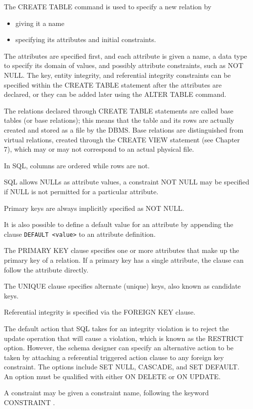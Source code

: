     \par The CREATE TABLE command is used to specify a new relation by
      \begin{itemize}
      \item giving it a name
      \item specifying its attributes and initial constraints.
      \end{itemize}
    \par The attributes are specified first, and each attribute is given a name, a data type to specify its domain of values, and possibly attribute constraints, such as NOT NULL. The key, entity integrity, and referential integrity constraints can be specified within the CREATE TABLE statement
after the attributes are declared, or they can be added later using the ALTER TABLE command.
    \par The relations declared through CREATE TABLE statements are called base tables (or base relations); this means that the table and its rows are actually created and stored as a file by the DBMS. Base relations are distinguished from virtual relations, created through the CREATE VIEW statement (see Chapter 7), which may or may not correspond to an actual physical file.
    \par In SQL, columns are ordered while rows are not.


    \par SQL allows NULLs as attribute values, a constraint NOT NULL may be specified if NULL is not permitted for a particular attribute.
    \par Primary keys are always implicitly specified as NOT NULL.
    \par It is also possible to define a default value for an attribute by appending the clause
      \lstinline{DEFAULT <value>} to an attribute definition.

    \par The PRIMARY KEY clause specifies one or more attributes that make up the primary
key of a relation. If a primary key has a single attribute, the clause can follow the
attribute directly.
    \par The UNIQUE clause specifies alternate (unique) keys, also known as candidate keys.
    \par Referential integrity is specified via the FOREIGN KEY clause.
    \par The default action that SQL takes for an integrity violation is to reject the update operation that will cause a violation, which is known as the RESTRICT option. However, the schema designer can specify an alternative action to be taken by attaching a referential triggered action clause to any foreign key constraint. The options include SET NULL, CASCADE, and SET DEFAULT. An
option must be qualified with either ON DELETE or ON UPDATE.
    \par A constraint may be given a constraint name, following the keyword CONSTRAINT .

